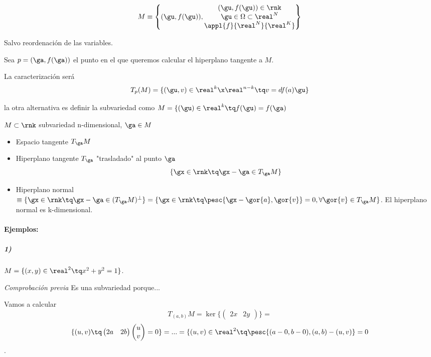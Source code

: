 \[M\equiv \left\{(\gu,f(\gu)),\begin{matrix}
(\gu,f(\gu))\in \rnk\\
\gu \in \Omega\subset\real^N\\
 \appl{f}{\real^N}{\real^K}\end{matrix}\right\} \]

Salvo reordenación de las variables.

Sea $p=(\ga,f(\ga))$ el punto en el que queremos calcular el hiperplano tangente a $M$.

La caracterización será
\[T_p(M) = \{(\gu,v)\in\real^k\x\real^{n-k} \tq v = df(a) \gu\}\]

\obs la otra alternativa es definir la subvariedad como $M = \{(\gu)\in\real^k \tq f(\gu) = f(\ga)$

\begin{defn}
$M\subset\rnk$ subvariedad n-dimensional, $\ga \in M$

\begin{itemize}
\item Espacio tangente $T_{\ga}M$
\item Hiperplano tangente $T_{\ga}$ "trasladado" al punto $\ga$
\[\{\gx \in \rnk \tq \gx-\ga \in T_{\ga}M\}\]
\item Hiperplano normal $\equiv \{\gx\in\rnk \tq \gx -\ga \in (T_{\ga}M)^{\bot}\} = \{\gx \in \rnk \tq \pesc{\gx-\gor{a},\gor{v}} = 0, \forall \gor{v}\in T_{\ga}M\}$. El hiperplano normal es k-dimensional.
\end{itemize}
\end{defn}


\paragraph{Ejemplos:}

\subparagraph{1)}

$ M = \{(x,y) \in \real^2 \tq x^2+y^2 = 1\}$.

\textit{Comprobación previa} Es una subvariedad porque...


Vamos a calcular \[T_{(a,b)}M = \ker \{\begin{pmatrix} 2x & 2y \end{pmatrix}\} =\]
\[ \{(u,v) \tq \begin{pmatrix}
2a & 2b
\end{pmatrix}\begin{pmatrix}
u\\v
\end{pmatrix} = 0\} = ... =  \{(u,v)\in \real^2 \tq \pesc{(a-0,b-0),(a,b)-(u,v)} = 0\].

